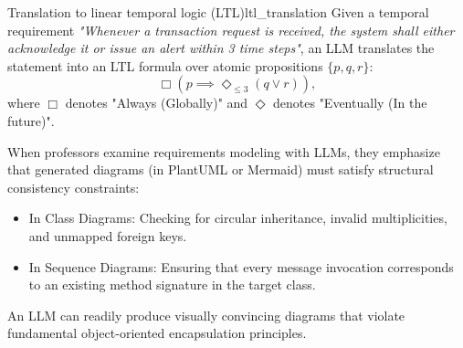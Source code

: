 \documentclass[../../main.tex]{subfiles}
\begin{document}
\begin{definition}{Translation to linear temporal logic (LTL)}{ltl_translation}
Given a temporal requirement \emph{"Whenever a transaction request is received, the system shall either acknowledge it or issue an alert within 3 time steps"}, an LLM translates the statement into an LTL formula over atomic propositions $\{p, q, r\}$:
\begin{equation}
\label{eq:ltl_spec}
\Box \left( p \implies \Diamond_{\le 3} (q \lor r) \right),
\end{equation}
where $\Box$ denotes "Always (Globally)" and $\Diamond$ denotes "Eventually (In the future)".
\end{definition}

\begin{examinsight}
When professors examine requirements modeling with LLMs, they emphasize that generated diagrams (in PlantUML or Mermaid) must satisfy structural consistency constraints:
\begin{itemize}
    \item In Class Diagrams: Checking for circular inheritance, invalid multiplicities, and unmapped foreign keys.
    \item In Sequence Diagrams: Ensuring that every message invocation corresponds to an existing method signature in the target class.
\end{itemize}
An LLM can readily produce visually convincing diagrams that violate fundamental object-oriented encapsulation principles.
\end{examinsight}
\end{document}
